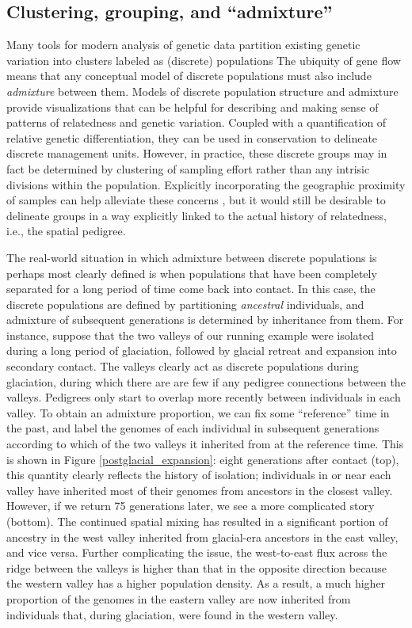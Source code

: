 \documentclass{ar-1col}
\renewcommand{\emph}[1]{{\textit{#1}}}
\begin{document}
\subsection{Clustering, grouping, and ``admixture''}

Many tools for modern analysis of genetic data
partition existing genetic variation into clusters labeled as (discrete) populations
\citep[e.g.,][]{STRUCTURE, ADMIXTURE}
The ubiquity of gene flow means that
any conceptual model of discrete populations 
must also include \emph{admixture} between them.
Models of discrete population structure and admixture 
provide visualizations that can be helpful for
describing and making sense of patterns of relatedness and genetic variation.
Coupled with a quantification of relative genetic differentiation,
they can be used in conservation to delineate discrete management units.
However, in practice, these discrete groups may in fact be determined
by clustering of sampling effort rather than any intrisic divisions within the population.
Explicitly incorporating the geographic proximity of samples 
can help alleviate these concerns \citep{spacemix,conStruct},
but it would still be desirable to delineate groups in a way explicitly linked
to the actual history of relatedness, i.e., the spatial pedigree.

The real-world situation in which admixture between discrete populations 
is perhaps most clearly defined is when populations that have been completely separated
for a long period of time come back into contact.
In this case, the discrete populations are defined by partitioning \emph{ancestral} individuals,
and admixture of subsequent generations is determined by inheritance from them.
For instance, suppose that 
the two valleys of our running example
were isolated during a long period of glaciation,
followed by glacial retreat and expansion into secondary contact.
The valleys clearly act as discrete populations during glaciation, 
during which there are are few if any pedigree connections between the valleys.
Pedigrees only start to overlap more recently between individuals in each valley.
To obtain an admixture proportion,
we can fix some ``reference'' time in the past,
and label the genomes of each individual in subsequent generations 
according to which of the two valleys it inherited from at the reference time.
This is shown in Figure \ref{postglacial_expansion}:
eight generations after contact (top),
this quantity clearly reflects the history of isolation;  
individuals in or near each valley have inherited most of their genomes 
from ancestors in the closest valley.
However, if we return 75 generations later, 
we see a more complicated story (bottom).
The continued spatial mixing has resulted in a significant 
portion of ancestry in the west valley inherited from 
glacial-era ancestors in the east valley, 
and vice versa.
Further complicating the issue, 
the west-to-east flux across the ridge between the valleys 
is higher than that in the opposite direction 
because the western valley has a higher population density. 
As a result, a much higher proportion of the genomes
in the eastern valley are now inherited 
from individuals that, 
during glaciation, were found in the western valley.
\end{document}
